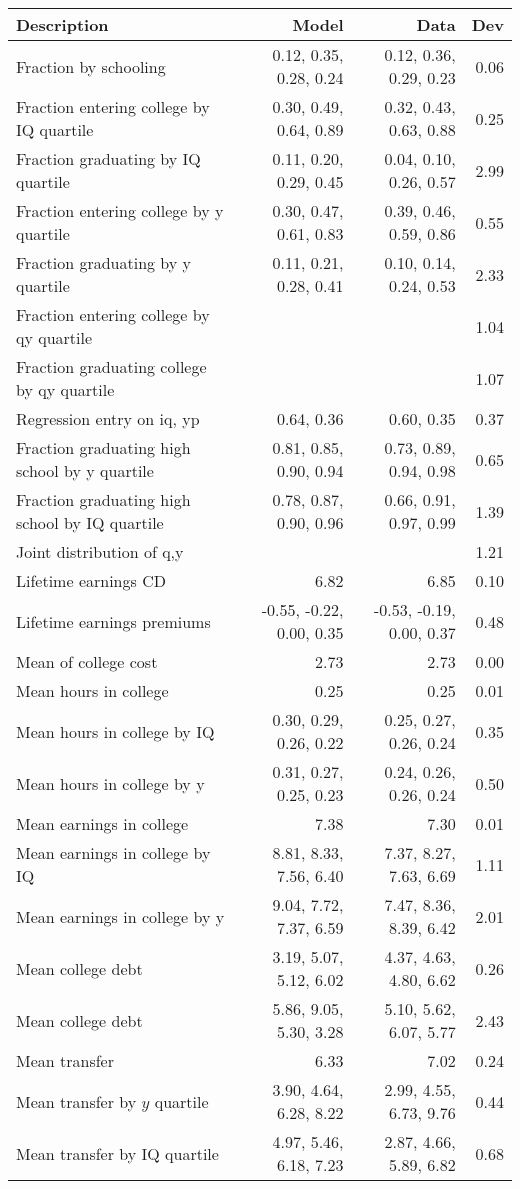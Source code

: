 \begin{tabular}{lrrr}
\hline
Description & Model  & Data  & Dev  \\ 
\hline
Fraction by schooling & 0.12, 0.35, 0.28, 0.24  & 0.12, 0.36, 0.29, 0.23  & 0.06  \\ 
Fraction entering college by IQ quartile & 0.30, 0.49, 0.64, 0.89  & 0.32, 0.43, 0.63, 0.88  & 0.25  \\ 
Fraction graduating by IQ quartile & 0.11, 0.20, 0.29, 0.45  & 0.04, 0.10, 0.26, 0.57  & 2.99  \\ 
Fraction entering college by y quartile & 0.30, 0.47, 0.61, 0.83  & 0.39, 0.46, 0.59, 0.86  & 0.55  \\ 
Fraction graduating by y quartile & 0.11, 0.21, 0.28, 0.41  & 0.10, 0.14, 0.24, 0.53  & 2.33  \\ 
Fraction entering college by qy quartile &   &   & 1.04  \\ 
Fraction graduating college by qy quartile &   &   & 1.07  \\ 
Regression entry on iq, yp & 0.64, 0.36  & 0.60, 0.35  & 0.37  \\ 
Fraction graduating high school by y quartile & 0.81, 0.85, 0.90, 0.94  & 0.73, 0.89, 0.94, 0.98  & 0.65  \\ 
Fraction graduating high school by IQ quartile & 0.78, 0.87, 0.90, 0.96  & 0.66, 0.91, 0.97, 0.99  & 1.39  \\ 
Joint distribution of q,y &   &   & 1.21  \\ 
Lifetime earnings CD & 6.82  & 6.85  & 0.10  \\ 
Lifetime earnings premiums & -0.55, -0.22, 0.00, 0.35  & -0.53, -0.19, 0.00, 0.37  & 0.48  \\ 
Mean of college cost & 2.73  & 2.73  & 0.00  \\ 
Mean hours in college & 0.25  & 0.25  & 0.01  \\ 
Mean hours in college by IQ & 0.30, 0.29, 0.26, 0.22  & 0.25, 0.27, 0.26, 0.24  & 0.35  \\ 
Mean hours in college by y & 0.31, 0.27, 0.25, 0.23  & 0.24, 0.26, 0.26, 0.24  & 0.50  \\ 
Mean earnings in college & 7.38  & 7.30  & 0.01  \\ 
Mean earnings in college by IQ & 8.81, 8.33, 7.56, 6.40  & 7.37, 8.27, 7.63, 6.69  & 1.11  \\ 
Mean earnings in college by y & 9.04, 7.72, 7.37, 6.59  & 7.47, 8.36, 8.39, 6.42  & 2.01  \\ 
Mean college debt & 3.19, 5.07, 5.12, 6.02  & 4.37, 4.63, 4.80, 6.62  & 0.26  \\ 
Mean college debt & 5.86, 9.05, 5.30, 3.28  & 5.10, 5.62, 6.07, 5.77  & 2.43  \\ 
Mean transfer & 6.33  & 7.02  & 0.24  \\ 
Mean transfer by $y$ quartile & 3.90, 4.64, 6.28, 8.22  & 2.99, 4.55, 6.73, 9.76  & 0.44  \\ 
Mean transfer by IQ quartile & 4.97, 5.46, 6.18, 7.23  & 2.87, 4.66, 5.89, 6.82  & 0.68  \\ 
\hline
\end{tabular}%

